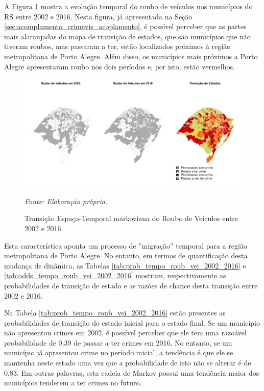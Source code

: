 \documentclass[12pt,openright,oneside,a4paper,english,french,spanish]{abntex2}
\numberwithin{table}{section} %
\numberwithin{figure}{section} %
\newcommand{\source}[1]{\textit{#1}}
\begin{document}
A Figura \ref{fig:mapas_roub_vei_markov_2002_2016} mostra a evolução temporal do roubo de veículos nos municípios do RS entre 2002 e 2016. Nesta figura, já apresentada na Seção \ref{sec:acomplamento_crimevis_acoplamento}, é possível perceber que as partes mais alaranjadas do mapa de transição de estados, que são municípios que não tiveram roubos, mas passaram a ter, estão localizados próximos à região metropolitana de Porto Alegre. Além disso, os municípios mais próximos a Porto Alegre apresentaram roubo nos dois períodos e, por isto, estão vermelhos.

\begin{figure}[H]
\begin{center}
\includegraphics{TESE_DE_DOUTORADO_RENAN_FINAL-map_roub_vei_2002_2016}
\end{center}
\caption{Transição Espaço-Temporal markoviana do Roubo de Veículos entre 2002 e 2016}
\source{Fonte: Elaboração própria.}
\label{fig:mapas_roub_vei_markov_2002_2016}
\end{figure}

Esta característica aponta um processo de ''migração'' temporal para a região metropolitana de Porto Alegre. No entanto, em termos de quantificação desta mudança de dinâmica, as Tabelas \ref{tab:prob_tempo_roub_vei_2002_2016} e \ref{tab:odds_tempo_roub_vei_2002_2016} mostram, respectivamente as probabilidades de transição de estado e as razões de chance desta transição entre 2002 e 2016.

Na Tabela \ref{tab:prob_tempo_roub_vei_2002_2016} estão presentes as probabilidades de transição do estado inicial para o estado final. Se um município não apresentou crimes em 2002, é possível perceber que ele tem uma razoável probabilidade de 0,39 de passar a ter crimes em 2016. No entanto, se um município já apresentou crime no período inicial, a tendência é que ele se mantenha neste estado uma vez que a probabilidade de isto não se alterar é de 0,83. Em outras palavras, esta cadeia de Markov possui uma tendência maior dos municípios tenderem a ter crimes no futuro.
\end{document}
